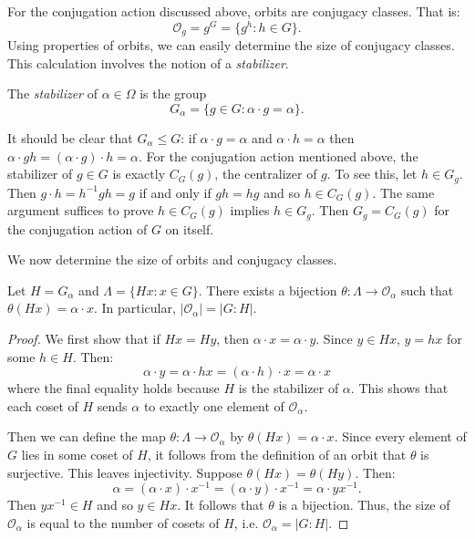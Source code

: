 \documentclass[main.tex]{subfiles}
\begin{document}
For the conjugation action discussed above, orbits are conjugacy classes. That is:
$$\mathcal{O}_g = g^G = \{g^{h} : h \in G \} \text{.}$$
 Using properties of orbits, we can easily determine the size of conjugacy classes. This calculation involves the notion of a \emph{stabilizer}.

\hss

\begin{definition}
The \emph{stabilizer} of $\alpha \in \Omega$ is the group 
$$G_\alpha = \{g \in G : \alpha \cdot g = \alpha \} \text{.}$$
\end{definition}

\hss

It should be clear that $G_\alpha \le G$: if $\alpha \cdot g = \alpha$ and $\alpha \cdot h = \alpha$ then $\alpha \cdot gh = (\alpha \cdot g) \cdot h = \alpha$. For the conjugation action mentioned above, the stabilizer of $g \in G$ is exactly $C_G(g)$, the centralizer of $g$. To see this, let $h \in G_g$. Then $g \cdot h = h^{-1} g h = g$ if and only if $gh = hg$ and so $h \in C_G(g)$. The same argument suffices to prove $h \in C_G(g)$ implies $h \in G_g$. Then $G_g = C_G(g)$ for the conjugation action of $G$ on itself.

We now determine the size of orbits and conjugacy classes.

\begin{theorem}
Let $H = G_\alpha$ and $\Lambda = \{H x : x \in G\}$. There exists a bijection $\theta : \Lambda \to \mathcal{O}_\alpha$ such that $\theta(H x) = \alpha \cdot x$. In particular,
$|\mathcal{O}_\alpha| = |G : H|$.
\end{theorem}

\begin{proof}
We first show that if $H x = H y$, then $\alpha \cdot x = \alpha \cdot y$. Since $y \in Hx$, $y = h x$ for some $h \in H$. Then:
$$\alpha \cdot y = \alpha \cdot h x = (\alpha \cdot h) \cdot x = \alpha \cdot x$$
where the final equality holds because $H$ is the stabilizer of $\alpha$. This shows that each coset of $H$ sends $\alpha$ to exactly one element of $\mathcal{O}_\alpha$.

Then we can define the map $\theta: \Lambda \to \mathcal{O}_\alpha$ by $\theta(H x) = \alpha \cdot x$. Since every element of $G$ lies in some coset of $H$, it follows from the definition of an orbit that $\theta$ is surjective. This leaves injectivity. Suppose $\theta(H x) = \theta(H y)$. Then:
$$ \alpha = (\alpha \cdot x ) \cdot x^{-1} = (\alpha \cdot y) \cdot x^{-1} = \alpha \cdot y x^{-1} \text{.}$$
Then $y x^{-1} \in H$ and so $y \in Hx$. It follows that $\theta$ is a bijection. Thus, the size of $\mathcal{O}_\alpha$ is equal to the number of cosets of $H$, i.e. $\mathcal{O}_\alpha = |G : H|$.

\end{proof}
\end{document}

